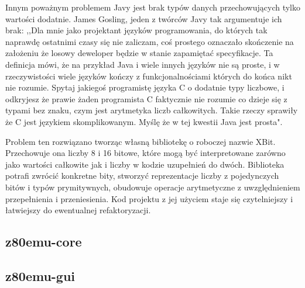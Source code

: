 	Innym poważnym problemem Javy jest brak typów danych przechowujących tylko wartości dodatnie. James Gosling, jeden z twórców Javy tak argumentuje ich brak: 
	,,Dla mnie jako projektant języków programowania, do których tak naprawdę ostatnimi czasy się nie zaliczam, coś prostego oznaczało skończenie na założeniu że losowy deweloper będzie w stanie zapamiętać specyfikacje. 
	Ta definicja mówi, że na przykład Java i wiele innych języków nie są proste, i w rzeczywistości wiele języków kończy z funkcjonalnościami których do końca nikt nie rozumie. Spytaj jakiegoś programistę języka C o dodatnie typy liczbowe, i odkryjesz że prawie żaden programista C faktycznie nie rozumie co dzieje się z typami bez znaku, czym jest arytmetyka liczb całkowitych. Takie rzeczy sprawiły że C jest językiem skomplikowanym. Myślę że w tej kwestii Java jest prosta"\cite{javaGoslingInterview}.
	
	Problem ten rozwiązano tworząc własną bibliotekę o roboczej nazwie XBit. Przechowuje ona liczby 8 i 16 bitowe, które mogą być interpretowane zarówno jako wartości całkowite jak i liczby w kodzie uzupełnień do dwóch. Biblioteka potrafi zwrócić konkretne bity, stworzyć reprezentacje liczby z pojedynczych bitów i typów prymitywnych, obudowuje operacje arytmetyczne z uwzględnieniem przepełnienia i przeniesienia. Kod projektu z jej użyciem staje się czytelniejszy i łatwiejszy do ewentualnej refaktoryzacji. 
	
	\subsection{z80emu-core}
	
	\subsection{z80emu-gui}
	
	
	